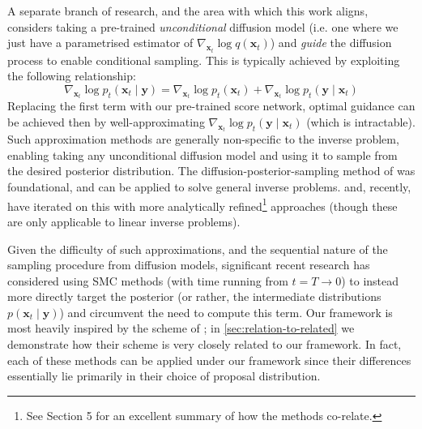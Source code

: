 A separate branch of research, and the area with which this work aligns, considers taking a pre-trained
\emph{unconditional} diffusion model (i.e. one where we just have a parametrised estimator of
$\nabla_{\mathbf{x}_t}\log q(\mathbf{x}_t)$) and \emph{guide} the diffusion process to enable
conditional sampling. This is typically achieved by exploiting the following relationship:
\begin{equation}
    \nabla_{\mathbf{x}_t} \log p_t(\mathbf{x}_t \mid \mathbf{y}) = \nabla_{\mathbf{x}_t} \log p_t(\mathbf{x}_t) + \nabla_{\mathbf{x}_t}\log p_t(\mathbf{y} \mid \mathbf{x}_t) \label{eq:cond-score}
\end{equation}
Replacing the first term with our pre-trained score network, optimal guidance can be achieved then
by well-approximating $\nabla_{\mathbf{x}_t}\log p_t(\mathbf{y} \mid \mathbf{x}_t)$ (which is
intractable). Such approximation methods are generally non-specific to the inverse problem, enabling
taking any unconditional diffusion model and using it to sample from the desired posterior
distribution. The diffusion-posterior-sampling method of
\textcite{chungDiffusionPosteriorSampling2022} was foundational, and can be applied to solve general
inverse problems. \textcite{song2023pseudoinverseguided} and, recently,
\textcite{boysTweedieMomentProjected2023} have iterated on this with more analytically
refined\footnote{See \cite{boysTweedieMomentProjected2023} Section 5 for an excellent summary
of how the methods co-relate.}
approaches (though these are only applicable to linear inverse problems).

Given the difficulty of such approximations, and the sequential nature of the sampling procedure
from diffusion models, significant recent research
\parencite{cardosoMonteCarloGuided2023,trippeDiffusionProbabilisticModeling2023,
wuPracticalAsymptoticallyExact2023,douDiffusionPosteriorSampling2023,
janatiDivideandConquerPosteriorSampling2024} has considered using SMC methods (with time running
from $t=T \to 0$) to instead more directly target the posterior (or rather, the intermediate
distributions $p(\mathbf{x}_t \mid \mathbf{y})$) and circumvent the need to compute this term. Our
framework is most heavily inspired by the scheme of \textcite{cardosoMonteCarloGuided2023}; in
\autoref{sec:relation-to-related} we demonstrate how their scheme is very closely related to our
framework. In fact, each of these methods can be applied under our framework since their differences
essentially lie primarily in their choice of proposal distribution.


